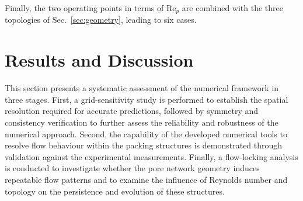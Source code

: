 Finally, the two operating points in terms of Re$_p$ are combined with the three topologies of Sec.~\ref{sec:geometry}, leading to six cases.

\section{Results and Discussion}
\label{sec:results}
This section presents a systematic assessment of the numerical framework in three stages. First, a grid-sensitivity study is performed to establish the spatial resolution required for accurate predictions, followed by symmetry and consistency verification to further assess the reliability and robustness of the numerical approach. Second, the capability of the developed numerical tools to resolve flow behaviour within the packing structures is demonstrated through validation against the experimental measurements. Finally, a flow-locking analysis is conducted to investigate whether the pore network geometry induces repeatable flow patterns and to examine the influence of Reynolds number and topology on the persistence and evolution of these structures.

